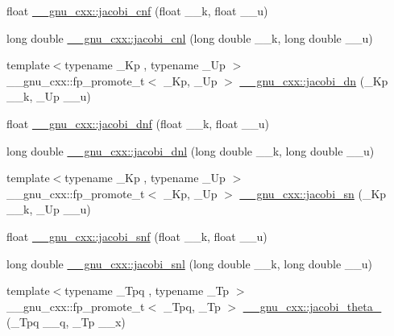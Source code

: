 \begin{DoxyCompactItemize}
\item 
float \hyperlink{group__gnu__math__spec__func_gadbd6320123f45ae10d539cf8df0373cd}{\+\_\+\+\_\+gnu\+\_\+cxx\+::jacobi\+\_\+cnf} (float \+\_\+\+\_\+k, float \+\_\+\+\_\+u)
\item 
long double \hyperlink{group__gnu__math__spec__func_ga08892965ea520116cc53a764513fe685}{\+\_\+\+\_\+gnu\+\_\+cxx\+::jacobi\+\_\+cnl} (long double \+\_\+\+\_\+k, long double \+\_\+\+\_\+u)
\item 
{\footnotesize template$<$typename \+\_\+\+Kp , typename \+\_\+\+Up $>$ }\\\+\_\+\+\_\+gnu\+\_\+cxx\+::fp\+\_\+promote\+\_\+t$<$ \+\_\+\+Kp, \+\_\+\+Up $>$ \hyperlink{group__gnu__math__spec__func_ga0f8fa8d6a77dbc2089d65f3f16876aa9}{\+\_\+\+\_\+gnu\+\_\+cxx\+::jacobi\+\_\+dn} (\+\_\+\+Kp \+\_\+\+\_\+k, \+\_\+\+Up \+\_\+\+\_\+u)
\item 
float \hyperlink{group__gnu__math__spec__func_gae96327d678adc6b5c4051f1c3649549a}{\+\_\+\+\_\+gnu\+\_\+cxx\+::jacobi\+\_\+dnf} (float \+\_\+\+\_\+k, float \+\_\+\+\_\+u)
\item 
long double \hyperlink{group__gnu__math__spec__func_gae59786991abbf8359deef49b6323065a}{\+\_\+\+\_\+gnu\+\_\+cxx\+::jacobi\+\_\+dnl} (long double \+\_\+\+\_\+k, long double \+\_\+\+\_\+u)
\item 
{\footnotesize template$<$typename \+\_\+\+Kp , typename \+\_\+\+Up $>$ }\\\+\_\+\+\_\+gnu\+\_\+cxx\+::fp\+\_\+promote\+\_\+t$<$ \+\_\+\+Kp, \+\_\+\+Up $>$ \hyperlink{group__gnu__math__spec__func_ga49d5e18152dd0dd0f496b8c8582e7045}{\+\_\+\+\_\+gnu\+\_\+cxx\+::jacobi\+\_\+sn} (\+\_\+\+Kp \+\_\+\+\_\+k, \+\_\+\+Up \+\_\+\+\_\+u)
\item 
float \hyperlink{group__gnu__math__spec__func_ga5981245b7343da6e21d445bb01fdba9c}{\+\_\+\+\_\+gnu\+\_\+cxx\+::jacobi\+\_\+snf} (float \+\_\+\+\_\+k, float \+\_\+\+\_\+u)
\item 
long double \hyperlink{group__gnu__math__spec__func_ga1c13539e3b051a07b1c28aa8a0aeb1b4}{\+\_\+\+\_\+gnu\+\_\+cxx\+::jacobi\+\_\+snl} (long double \+\_\+\+\_\+k, long double \+\_\+\+\_\+u)
\item 
{\footnotesize template$<$typename \+\_\+\+Tpq , typename \+\_\+\+Tp $>$ }\\\+\_\+\+\_\+gnu\+\_\+cxx\+::fp\+\_\+promote\+\_\+t$<$ \+\_\+\+Tpq, \+\_\+\+Tp $>$ \hyperlink{group__gnu__math__spec__func_ga996ca8c1fff75e2d4f196e99e0919933}{\+\_\+\+\_\+gnu\+\_\+cxx\+::jacobi\+\_\+theta\+\_} (\+\_\+\+Tpq \+\_\+\+\_\+q, \+\_\+\+Tp \+\_\+\+\_\+x)

\end{DoxyCompactItemize}
